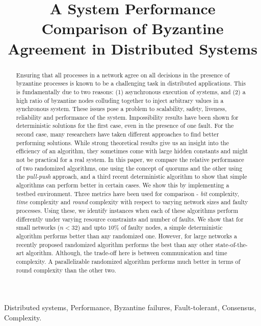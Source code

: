 \title{A System Performance Comparison of Byzantine Agreement in Distributed Systems}


\author{

\and
{}
}

\maketitle

\begin{abstract}

Ensuring that all processes in a network agree on all decisions in the
presence of byzantine processes is known to be a challenging task in
distributed applications. This is fundamentally due to two reasons: (1)
asynchronous execution of systems, and (2) a high ratio of byzantine
nodes colluding together to inject arbitrary values in a synchronous
system. These issues pose a problem to scalability, safety, liveness,
reliability and performance of the system. Impossibility results have
been shown for deterministic solutions for the first case, even in the
presence of one fault. For the second case, many researchers have taken
different approaches to find better performing solutions. While strong
theoretical results give us an insight into the efficiency of an
algorithm, they sometimes come with large hidden constants and might not
be practical for a real system. In this paper, we compare the relative
performance of two randomized algorithms, one using the concept of
quorums and the other using the {\em pull-push} approach, and a third recent
deterministic algorithm to show that simple algorithms can perform
better in certain cases. We show this by implementing a testbed
environment. Three metrics have been used for comparison - {\em bit}
complexity, {\em time} complexity and {\em round} complexity with respect to varying network sizes and
faulty processes. Using these, we identify instances when each of these
algorithms perform differently under varying resource constraints and
number of faults. We show that for small networks ($n<32$) and upto $10\%$ of faulty nodes, a simple deterministic algorithm performs better than any randomized one. However, for large networks a recently proposed randomized algorithm performs the best than any other state-of-the-art algorithm. Although, the trade-off here is between communication and time complexity. A parallelizable randomized algorithm performs much better in terms of round complexity than the other two. 

\end{abstract}

 Distributed systems, Performance, Byzantine failures, Fault-tolerant, Consensus, Complexity.
